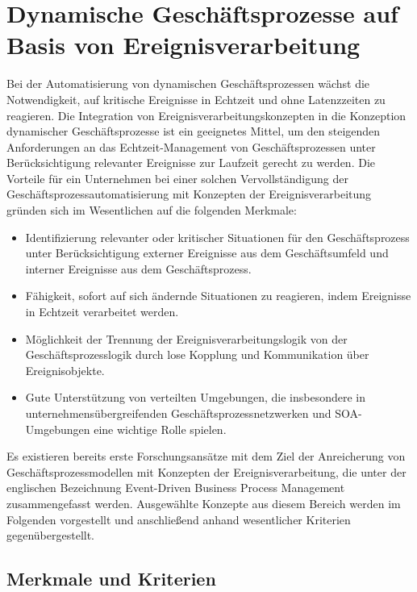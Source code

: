 \section{Dynamische Geschäftsprozesse auf Basis von Ereignisverarbeitung}\label{sec:Kombi}
Bei der Automatisierung von dynamischen Geschäftsprozessen wächst die Notwendigkeit, auf kritische Ereignisse in Echtzeit und ohne Latenzzeiten zu reagieren. 
Die Integration von Ereignisverarbeitungskonzepten in die Konzeption dynamischer Geschäftsprozesse ist ein geeignetes Mittel, um den steigenden Anforderungen an das Echtzeit-Management von Geschäftsprozessen unter Berücksichtigung relevanter Ereignisse zur Laufzeit gerecht zu werden. 
\cite{Abolhassan.2016}
Die Vorteile für ein Unternehmen bei einer solchen Vervollständigung der Geschäftsprozessautomatisierung mit Konzepten der Ereignisverarbeitung gründen sich im Wesentlichen auf die folgenden Merkmale:

\begin{itemize}
    \item 
    Identifizierung relevanter oder kritischer Situationen für den Geschäftsprozess unter Berücksichtigung externer Ereignisse aus dem Geschäftsumfeld und interner Ereignisse aus dem Geschäftsprozess.
    \item 
    Fähigkeit, sofort auf sich ändernde Situationen zu reagieren, indem Ereignisse in Echtzeit verarbeitet werden.
    \item
    Möglichkeit der Trennung der Ereignisverarbeitungslogik von der Geschäftsprozesslogik durch lose Kopplung und Kommunikation über Ereignisobjekte.
    \item
    Gute Unterstützung von verteilten Umgebungen, die insbesondere in unternehmensübergreifenden Geschäftsprozessnetzwerken und \ac{SOA}-Umgebungen eine wichtige Rolle spielen.
\end{itemize}

Es existieren bereits erste Forschungsansätze mit dem Ziel der Anreicherung von Geschäftsprozessmodellen mit Konzepten der Ereignisverarbeitung, die unter der englischen Bezeichnung Event-Driven Business Process Management zusammengefasst werden. Ausgewählte Konzepte aus diesem Bereich werden im Folgenden vorgestellt und anschließend anhand wesentlicher Kriterien gegenübergestellt.

\subsection{Merkmale und Kriterien}

